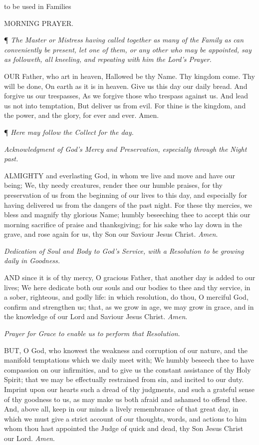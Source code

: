 to be used in Families

MORNING
PRAYER.

¶
\emph{The Master or Mistress having called together as many of the Family
as can conveniently be present, let one of them, or any other who may
be appointed, say as followeth, all kneeling, and repeating with him
the Lord’s Prayer.}

OUR
Father, who art in heaven, Hallowed be thy Name. Thy kingdom come. Thy
will be done, On earth as it is in heaven. Give us this day our daily
bread. And forgive us our trespasses, As we forgive those who trespass
against us. And lead us not into temptation, But deliver us from evil.
For thine is the kingdom, and the power, and the glory, for ever and
ever. Amen.

¶
\emph{Here may follow the Collect for the day.}

\emph{Acknowledgment
of God’s Mercy and Preservation, especially through the Night past.}

ALMIGHTY
and everlasting God, in whom we live and move and have our being; We,
thy needy creatures, render thee our humble praises, for thy preservation
of us from the beginning of our lives to this day, and especially for
having delivered us from the dangers of the past night. For these thy
mercies, we bless and magnify thy glorious Name; humbly beseeching thee
to accept this our morning sacrifice of praise and thanksgiving; for
his sake who lay down in the grave, and rose again for us, thy Son our
Saviour Jesus Christ. \emph{Amen}.

\emph{Dedication
of Soul and Body to God’s Service, with a Resolution to be growing daily in Goodness.}

AND
since it is of thy mercy, O gracious Father, that another day is added
to our lives; We here dedicate both our souls and our bodies to thee and
thy service, in a sober, righteous, and godly life: in which resolution,
do thou, O merciful God, confirm and strengthen us; that, as we grow in
age, we may grow in grace, and in the knowledge of our Lord and Saviour
Jesus Christ. \emph{Amen}.

\emph{Prayer for Grace to enable us to perform that Resolution}.

BUT, O God, who knowest
the weakness and corruption of our nature, and the manifold temptations
which we daily meet with; We humbly beseech thee to have compassion on
our infirmities, and to give us the constant assistance of thy Holy Spirit;
that we may be effectually restrained from sin, and incited to our duty.
Imprint upon our hearts such a dread of thy judgments, and such a grateful
sense of thy goodness to us, as may make us both afraid and ashamed to
offend thee. And, above all, keep in our minds a lively remembrance of
that great day, in which we must give a strict account of our thoughts,
words, and actions to him whom thou hast appointed the Judge of quick
and dead, thy Son Jesus Christ our Lord. \emph{Amen}.

